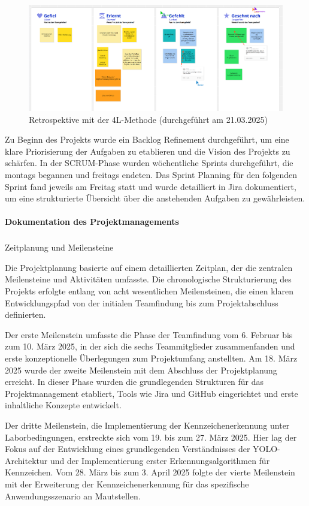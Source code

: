 \begin{figure}[h]
    \centering
    \includegraphics[width=1.0\textwidth]{data/4l.png}
    \caption{Retrospektive mit der 4L-Methode (durchgeführt am 21.03.2025)}
    \label{fig:da}
\end{figure}

Zu Beginn des Projekts wurde ein Backlog Refinement durchgeführt, um eine klare Priorisierung der Aufgaben zu etablieren und die Vision des Projekts zu schärfen. In der SCRUM-Phase wurden wöchentliche Sprints durchgeführt, die montags begannen und freitags endeten. Das Sprint Planning für den folgenden Sprint fand jeweils am Freitag statt und wurde detailliert in Jira dokumentiert, um eine strukturierte Übersicht über die anstehenden Aufgaben zu gewährleisten.

\paragraph{Dokumentation des Projektmanagements}

\subparagraph{}{Zeitplanung und Meilensteine}

Die Projektplanung basierte auf einem detaillierten Zeitplan, der die zentralen Meilensteine und Aktivitäten umfasste. Die chronologische Strukturierung des Projekts erfolgte entlang von acht wesentlichen Meilensteinen, die einen klaren Entwicklungspfad von der initialen Teamfindung bis zum Projektabschluss definierten.

Der erste Meilenstein umfasste die Phase der Teamfindung vom 6. Februar bis zum 10. März 2025, in der sich die sechs Teammitglieder zusammenfanden und erste konzeptionelle Überlegungen zum Projektumfang anstellten. Am 18. März 2025 wurde der zweite Meilenstein mit dem Abschluss der Projektplanung erreicht. In dieser Phase wurden die grundlegenden Strukturen für das Projektmanagement etabliert, Tools wie Jira und GitHub eingerichtet und erste inhaltliche Konzepte entwickelt.

Der dritte Meilenstein, die Implementierung der Kennzeichenerkennung unter Laborbedingungen, erstreckte sich vom 19. bis zum 27. März 2025. Hier lag der Fokus auf der Entwicklung eines grundlegenden Verständnisses der YOLO-Architektur und der Implementierung erster Erkennungsalgorithmen für Kennzeichen. Vom 28. März bis zum 3. April 2025 folgte der vierte Meilenstein mit der Erweiterung der Kennzeichenerkennung für das spezifische Anwendungsszenario an Mautstellen.

